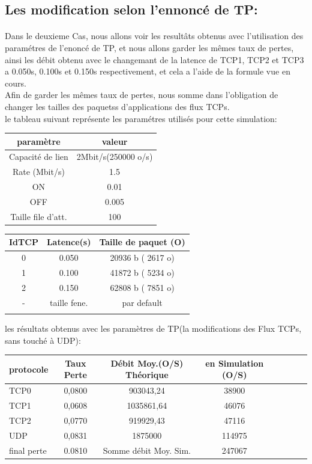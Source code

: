 \documentclass[a4paper]{report}
\theoremstyle{definition}
\begin{document}
\subsection*{Les modification selon l'ennoncé de TP:}
\paragraph{}
	Dans le deuxieme Cas, nous allons voir les resultâts obtenus avec l'utilisation des paramétres de l'enoncé de TP, et nous allons garder les mêmes taux de pertes, ainsi les débit obtenu avec le changemant de la latence de TCP1, TCP2 et TCP3 a 0.050s, 0.100s et 0.150s respectivement, et cela a l'aide de la formule vue en cours.\\
	Afin de garder les mêmes taux de pertes, nous somme dans l'obligation de changer les tailles des paquetss d'applications des flux TCPs.\\
	le tableau suivant représente les paramétres utilisés pour cette simulation:
\begin{center}
\begin{tabular}{|c|c|}
\hline
 paramètre  & valeur \\ \hline
 
 Capacité de lien & 2Mbit/s(250000 o/s) \\ 
 Rate (Mbit/s) & 1.5 \\ 
 ON & 0.01\\ 
 OFF & 0.005 \\ 
 Taille file d'att. & 100\\
\hline
\end{tabular}
\begin{tabular}{|c|c|c|}
\hline
 IdTCP  & Latence(s) & Taille de paquet (O) \\ \hline
 
 0 & 0.050 & 20936 b ( 2617 o)	 \\ 
 1 & 0.100 & 41872 b ( 5234 o)	 \\ 
 2 & 0.150 & 62808 b ( 7851 o)	 \\ 
 - & taille fene. & par default\\ 
 &&\\
 
\hline
\end{tabular}\newline

les résultats obtenus avec les paramètres de TP(la modifications des Flux TCPs, sans touché à UDP): \\ 

\begin{tabular}{|l|c|c|c|c|c|c|c|}
\hline
 protocole & Taux Perte & Débit Moy.(O/S) Théorique & en Simulation (O/S) \\ \hline
 TCP0 & 0,0800 &  903043,24 &  38900     \\
 TCP1 & 0,0608 & 1035861,64 &  46076     \\ 
 TCP2 & 0,0770 &  919929,43 &  47116     \\ 
 UDP  & 0,0831 & 1875000 & 114975 \\ 
 \hline
 final perte & 0.0810  & Somme débit Moy. Sim. & 247067   \\ 
\hline

\end{tabular}
\end{center}
\end{document}
